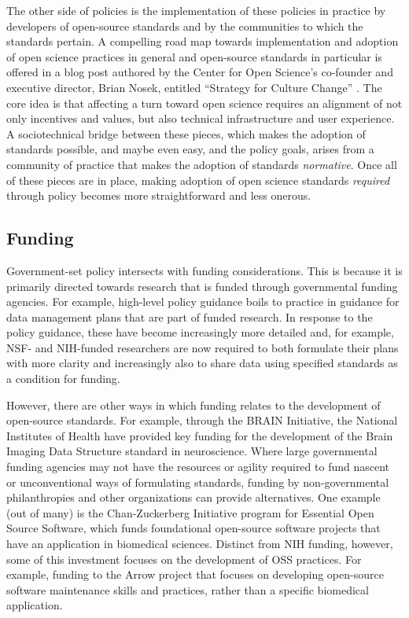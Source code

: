 \documentclass[
  number]{elsarticle}
\begin{document}
The other side of policies is the implementation of these policies in
practice by developers of open-source standards and by the communities
to which the standards pertain. A compelling road map towards
implementation and adoption of open science practices in general and
open-source standards in particular is offered in a blog post authored
by the Center for Open Science's co-founder and executive director,
Brian Nosek, entitled ``Strategy for Culture Change''
\citep{Nosek2019CultureChange}. The core idea is that affecting a turn
toward open science requires an alignment of not only incentives and
values, but also technical infrastructure and user experience. A
sociotechnical bridge between these pieces, which makes the adoption of
standards possible, and maybe even easy, and the policy goals, arises
from a community of practice that makes the adoption of standards
\emph{normative}. Once all of these pieces are in place, making adoption
of open science standards \emph{required} through policy becomes more
straightforward and less onerous.

\subsection{Funding}\label{funding}

Government-set policy intersects with funding considerations. This is
because it is primarily directed towards research that is funded through
governmental funding agencies. For example, high-level policy guidance
boils to practice in guidance for data management plans that are part of
funded research. In response to the policy guidance, these have become
increasingly more detailed and, for example, NSF- and NIH-funded
researchers are now required to both formulate their plans with more
clarity and increasingly also to share data using specified standards as
a condition for funding.

However, there are other ways in which funding relates to the
development of open-source standards. For example, through the BRAIN
Initiative, the National Institutes of Health have provided key funding
for the development of the Brain Imaging Data Structure standard in
neuroscience. Where large governmental funding agencies may not have the
resources or agility required to fund nascent or unconventional ways of
formulating standards, funding by non-governmental philanthropies and
other organizations can provide alternatives. One example (out of many)
is the Chan-Zuckerberg Initiative program for Essential Open Source
Software, which funds foundational open-source software projects that
have an application in biomedical sciences. Distinct from NIH funding,
however, some of this investment focuses on the development of OSS
practices. For example, funding to the Arrow project that focuses on
developing open-source software maintenance skills and practices, rather
than a specific biomedical application.
\end{document}
